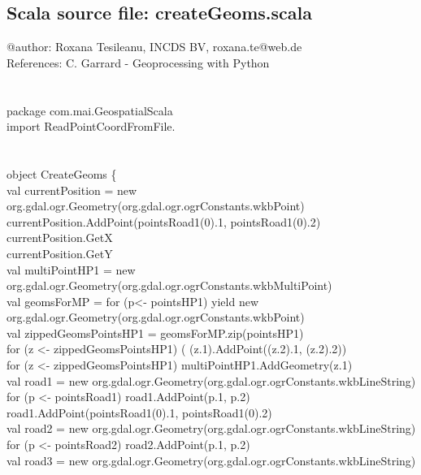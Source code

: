 \documentclass {article}
\begin{document}
\begin{appendices}
\section {Scala source file: createGeoms.scala}


@author: Roxana Tesileanu, INCDS BV, roxana.te@web.de\\
References: C. Garrard - Geoprocessing with Python\\
\\
\\
package com.mai.GeospatialScala\\
import ReadPointCoordFromFile.\underline{\space}\\
\\
\\
object CreateGeoms \{ \\
val currentPosition = new org.gdal.ogr.Geometry(org.gdal.ogr.ogrConstants.wkbPoint)\\
currentPosition.AddPoint(pointsRoad1(0).\underline{\space}1, pointsRoad1(0).\underline{\space}2)\\
currentPosition.GetX\\
currentPosition.GetY\\
val multiPointHP1 = new org.gdal.ogr.Geometry(org.gdal.ogr.ogrConstants.wkbMultiPoint)\\
val geomsForMP = for (p<- pointsHP1) yield new org.gdal.ogr.Geometry(org.gdal.ogr.ogrConstants.wkbPoint)\\
val zippedGeomsPointsHP1 = geomsForMP.zip(pointsHP1)\\
for (z <- zippedGeomsPointsHP1)  ( (z.\underline{\space}1).AddPoint((z.\underline{\space}2).\underline{\space}1, (z.\underline{\space}2).\underline{\space}2))\\
for (z <- zippedGeomsPointsHP1) multiPointHP1.AddGeometry(z.\underline{\space}1)\\
val road1 = new org.gdal.ogr.Geometry(org.gdal.ogr.ogrConstants.wkbLineString)\\
for (p <- pointsRoad1) road1.AddPoint(p.\underline{\space}1, p.\underline{\space}2)\\
road1.AddPoint(pointsRoad1(0).\underline{\space}1, pointsRoad1(0).\underline{\space}2)\\
val road2 = new org.gdal.ogr.Geometry(org.gdal.ogr.ogrConstants.wkbLineString)\\
for (p <- pointsRoad2) road2.AddPoint(p.\underline{\space}1, p.\underline{\space}2)\\
val road3 = new org.gdal.ogr.Geometry(org.gdal.ogr.ogrConstants.wkbLineString)\\

\end{appendices}
\end{document}
